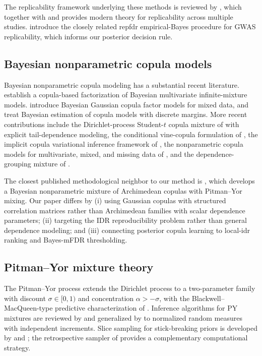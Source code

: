 The replicability framework underlying these methods is reviewed by \citet{BogomolovHeller2023Review}, which together with \citet{BogomolovHeller2018} and \citet{Bogomolov2023PartialConjunction} provides modern theory for replicability across multiple studies. \citet{HellerYaacoby2014repfdr} introduce the closely related repfdr empirical-Bayes procedure for GWAS replicability, which informs our posterior decision rule.

\subsection{Bayesian nonparametric copula models}

Bayesian nonparametric copula modeling has a substantial recent literature. \citet{BurdaProkhorov2014} establish a copula-based factorization of Bayesian multivariate infinite-mixture models. \citet{MurrayDunsonCarinLucas2013} introduce Bayesian Gaussian copula factor models for mixed data, and \citet{SmithKhaled2012} treat Bayesian estimation of copula models with discrete margins. More recent contributions include the Dirichlet-process Student-$t$ copula mixture of \citet{LiuLi2025MixT} with explicit tail-dependence modeling, the conditional vine-copula formulation of \citet{DallaValleLeisenRossiniZhu2024}, the implicit copula variational inference framework of \citet{SmithLoaizaMayaNott2023}, the nonparametric copula models for multivariate, mixed, and missing data of \citet{FeldmanKowal2024NPCopula}, and the dependence-grouping mixture of \citet{ZhuangDiaoYi2022}.

The closest published methodological neighbor to our method is \citet{PanNietoBarajasCraiu2024}, which develops a Bayesian nonparametric mixture of Archimedean copulas with Pitman--Yor mixing. Our paper differs by (i) using Gaussian copulas with structured correlation matrices rather than Archimedean families with scalar dependence parameters; (ii) targeting the IDR reproducibility problem rather than general dependence modeling; and (iii) connecting posterior copula learning to local-idr ranking and Bayes-mFDR thresholding.

\subsection{Pitman--Yor mixture theory}

The Pitman--Yor process \citep{PitmanYor1997} extends the Dirichlet process to a two-parameter family with discount $\sigma \in [0,1)$ and concentration $\alpha > -\sigma$, with the Blackwell--MacQueen-type predictive characterization of \citet{Pitman1996BlackwellMacQueen}. Inference algorithms for PY mixtures are reviewed by \citet{IshwaranJames2001} and generalized by \citet{FavaroTeh2013} to normalized random measures with independent increments. Slice sampling for stick-breaking priors is developed by \citet{Walker2007SliceSampling} and \citet{KalliGriffinWalker2011}; the retrospective sampler of \citet{PapaspiliopoulosRoberts2008} provides a complementary computational strategy.

